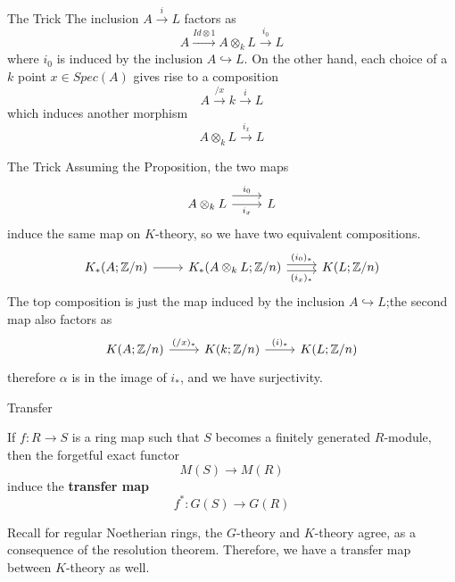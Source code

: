 \documentclass{beamer}
\begin{document}
\begin{frame}{The Trick}
The inclusion $A\xrightarrow{i} L$ factors as 
\[A\xrightarrow{Id\otimes 1}A\otimes_k L\xrightarrow{i_0} L\]
where $i_0$ is induced by the inclusion $A\hookrightarrow L$. \pause On the other hand, each choice of a $k$ point $x\in Spec(A)$ gives rise to a composition
\[A\xrightarrow{/x}k\xrightarrow{i}L\]
which induces another morphism 
\[A\otimes_k L\xrightarrow{i_x} L\]
  
\end{frame}

\begin{frame}[fragile]{The Trick}
  Assuming the Proposition, the two maps 
  \[\begin{tikzcd}
	{A\otimes_kL} & L
	\arrow["{i_x}"' , from=1-1, to=1-2]
	\arrow["{i_0}", shift left=3, from=1-1, to=1-2]
\end{tikzcd}\]
induce the same map on $K$-theory, so we have two equivalent compositions.
\[\begin{tikzcd}
	{K_*(A; \mathbb{Z}/n)} & {K_*(A\otimes_kL; \mathbb{Z}/n)} & {K(L; \mathbb{Z}/n)}
	\arrow[from=1-1, to=1-2]
	\arrow["{(i_x)_*}"', shift right, from=1-2, to=1-3]
	\arrow["{(i_0)_*}", shift left, from=1-2, to=1-3]
\end{tikzcd}\]
The top composition is just the map induced by the inclusion $A\hookrightarrow L$;\pause  the second map also factors as 
\[\begin{tikzcd}
	{K(A; \mathbb{Z}/n)} & {K(k; \mathbb{Z}/n)} & {K(L; \mathbb{Z}/n)}
	\arrow["{(/x)_*}", from=1-1, to=1-2]
	\arrow["{(i)_*}",from=1-2, to=1-3]
\end{tikzcd}\]
therefore $\alpha$ is in the image of $i_*$, and we have surjectivity.

\end{frame}



\begin{frame}{Transfer}
  \begin{definition}
    If $f: R\to S$ is a ring map such that $S$ becomes a finitely generated $R$-module, then the forgetful exact functor
    \[M(S)\to M(R)\]
     induce the \textbf{transfer map}
    \[f^*: G(S)\to G(R)\]
  \end{definition}
    Recall for regular Noetherian rings, the $G$-theory and $K$-theory agree, as a consequence of the resolution theorem. Therefore, we have a transfer map between $K$-theory as well. 

\end{frame}
\end{document}

